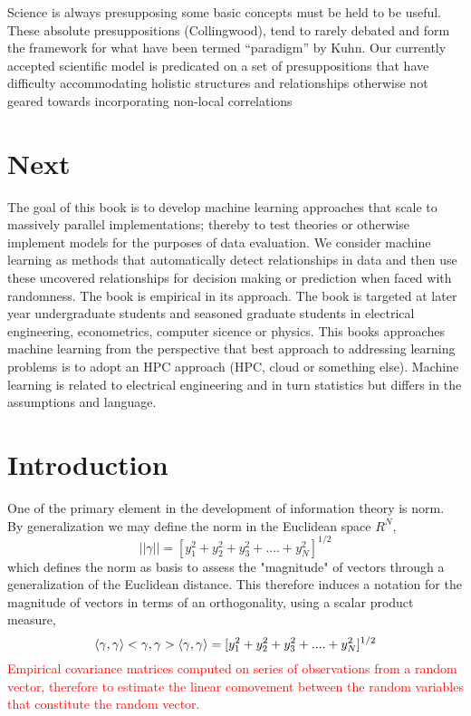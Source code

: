\documentclass[7pt]{article}
\begin{document}
Science is always presupposing some basic concepts must be held to be useful. These absolute presuppositions (Collingwood), tend to rarely debated and form the framework for what have been termed “paradigm” by Kuhn. Our currently accepted scientific model is predicated on a set of presuppositions that have difficulty accommodating holistic structures and relationships otherwise not geared towards incorporating non-local correlations

\section*{Next}
The goal of this book is to develop machine learning approaches that scale to massively parallel implementations; thereby to test theories or otherwise implement models for the purposes of data evaluation. We consider machine learning as  methods that automatically detect relationships in data and then use these uncovered relationships for decision making or prediction when faced with randomness. The book is empirical in its approach. The book is targeted at later year undergraduate students and seasoned graduate students in electrical engineering, econometrics, computer sicence or physics. This books approaches machine learning from the perspective that best approach to addressing learning problems is to adopt an HPC approach (HPC, cloud or something else). Machine learning is related to electrical engineering and in turn statistics but differs in the assumptions and language.
\section*{Introduction}
One of the primary element in the development of information theory is norm. By generalization we may define the norm in the Euclidean space $R^N$,
\begin{equation}
||\gamma|| = [y^2_1 + y^2_2 + y^2_3 + .... + y^2_N]^{1/2}
\end{equation}
which defines the norm as basis to assess the "magnitude" of vectors through a generalization of the Euclidean distance. This therefore induces a notation for the magnitude of vectors in terms of an orthogonality, using a scalar product measure,
\begin{equation}
\inn{\gamma,\gamma}
<\gamma,\gamma> \expval{\gamma,\gamma} = [y^2_1 + y^2_2 + y^2_3 + .... + y^2_N]^{1/2}
\end{equation}
\textcolor{red}{Empirical covariance matrices computed on series of observations from a random vector, therefore to estimate the linear comovement between the random variables that constitute the random vector.}
\end{document}
